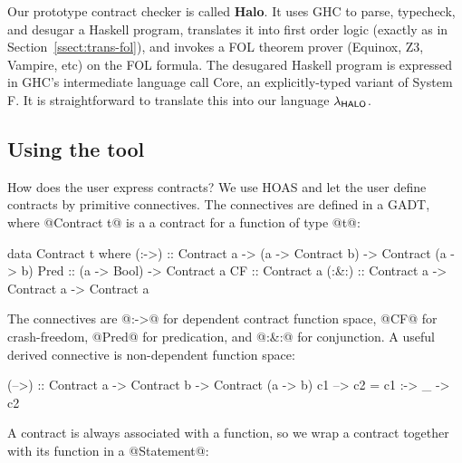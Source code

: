 Our prototype contract checker is called \textbf{Halo}.
It uses GHC to parse, typecheck, and desugar a Haskell program,
translates it into first order logic (exactly as in Section~\ref{ssect:trans-fol}), and
invokes a FOL theorem prover (Equinox, Z3, Vampire, etc) on the FOL formula.
The desugared Haskell program is expressed in GHC's intermediate language
call Core, an explicitly-typed variant of System F.  It is straightforward
to translate this into our language $\lambda_{\sf HALO}$.

\subsection{Using the tool}

How does the user express contracts? We use HOAS and let the user
define contracts by primitive connectives.  The connectives are
defined in a GADT, where @Contract t@ is a a contract for a function
of type @t@:
\begin{code}
data Contract t where
  (:->) :: Contract a -> (a -> Contract b) ->
           Contract (a -> b)
  Pred  :: (a -> Bool) -> Contract a
  CF    :: Contract a
  (:&:) :: Contract a -> Contract a -> Contract a
\end{code}

The connectives are @:->@ for dependent contract function space, @CF@
for crash-freedom, @Pred@ for predication, and
@:&:@ for conjunction.
A useful derived connective is non-dependent function space:
\par {\small
\begin{code}
(-->) :: Contract a -> Contract b -> Contract (a -> b)
c1 --> c2 = c1 :-> \_ -> c2
\end{code}
} \par
%
%

A contract is always associated with a function, so we wrap a contract
together with its function in a @Statement@:

